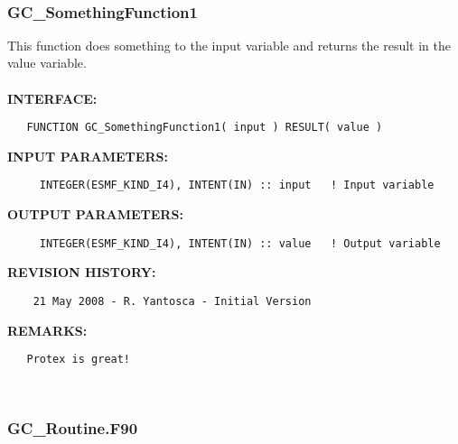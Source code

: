 \documentclass[11pt]{article}
\begin{document}
 
\mbox{}\hrulefill\ 
 

  \subsubsection [GC\_SomethingFunction1] {GC\_SomethingFunction1}


  This function does something to the input variable and returns 
   the result in the value variable.
  \\
  \\{\bf INTERFACE:}
\begin{verbatim}   FUNCTION GC_SomethingFunction1( input ) RESULT( value )\end{verbatim}{\bf INPUT PARAMETERS:}
\begin{verbatim}     INTEGER(ESMF_KIND_I4), INTENT(IN) :: input   ! Input variable \end{verbatim}{\bf OUTPUT PARAMETERS:}
\begin{verbatim}     INTEGER(ESMF_KIND_I4), INTENT(IN) :: value   ! Output variable\end{verbatim}{\bf REVISION HISTORY:}
\begin{verbatim}    21 May 2008 - R. Yantosca - Initial Version\end{verbatim}{\bf REMARKS:}
\begin{verbatim}   Protex is great!\end{verbatim}


 
 
\mbox{}\hrulefill\ 
 

  \subsubsection{GC\_Routine.F90 }
\end{document}

